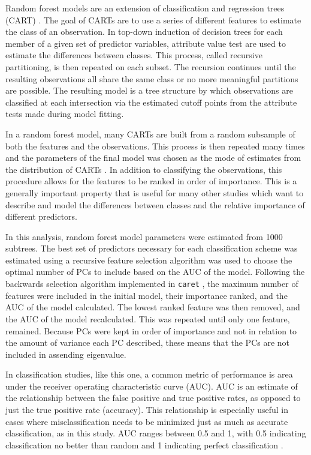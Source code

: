 \documentclass[12pt,letterpaper]{article}
\begin{document}
Random forest models are an extension of classification and regression trees (CART) \citep{Breiman1984,Breiman2001}. The goal of CARTs are to use a series of different features to estimate the class of an observation. In top-down induction of decision trees for each member of a given set of predictor variables, attribute value test are used to estimate the differences between classes. This process, called recursive partitioning, is then repeated on each subset. The recursion continues until the resulting observations all share the same class or no more meaningful partitions are possible. The resulting model is a tree structure by which observations are classified at each intersection via the estimated cutoff points from the attribute tests made during model fitting.

In a random forest model, many CARTs are built from a random subsample of both the features and the observations. This process is then repeated many times and the parameters of the final model was chosen as the mode of estimates from the distribution of CARTs \citep{Breiman2001}. In addition to classifying the observations, this procedure allows for the features to be ranked in order of importance. This is a generally important property that is useful for many other studies which want to describe and model the differences between classes and the relative importance of different predictors. 

In this analysis, random forest model parameters were estimated from 1000 subtrees. The best set of predictors necessary for each classification scheme was estimated using a recursive feature selection algorithm was used to choose the optimal number of PCs to include based on the AUC of the model. Following the backwards selection algorithm implemented in \texttt{caret} \citep{Kuhn2013}, the maximum number of features were included in the initial model, their importance ranked, and the AUC of the model calculated. The lowest ranked feature was then removed, and the AUC of the model recalculated. This was repeated until only one feature, remained. Because PCs were kept in order of importance and not in relation to the amount of variance each PC described, these means that the PCs are not included in assending eigenvalue.

In classification studies, like this one, a common metric of performance is area under the receiver operating characteristic curve (AUC). AUC is an estimate of the relationship between the false positive and true positive rates, as opposed to just the true positive rate (accuracy). This relationship is especially useful in cases where misclassification needs to be minimized just as much as accurate classification, as in this study. AUC ranges between 0.5 and 1, with 0.5 indicating classification no better than random and 1 indicating perfect classification \citep{Hastie2009}.
\end{document}
